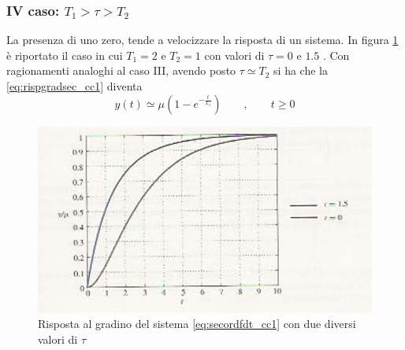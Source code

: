 \documentclass[a4paper]{report}
\begin{document}
\subsubsection{IV caso: $T_1 > \tau > T_2$}
La presenza di uno zero, tende a velocizzare la risposta di un
sistema. In figura \ref{fig:risp6} \`e riportato il caso in cui $T_1 =
2$ e $T_2 = 1$ con valori di $\tau = 0$ e $1.5$ . Con ragionamenti
analoghi al caso III, avendo posto $\tau \simeq T_2$ si ha che la
\ref{eq:rispgradsec_cc1} diventa
\begin{displaymath}
  y(t)\simeq \mu (1-e^{-\frac{t}{T_1}})\qquad , \qquad t\geq0
\end{displaymath}
\begin{figure}[!h]
  \begin{center}
    \includegraphics[scale=0.5]{./figures/rispscal6.png}
    \caption{Risposta al gradino del sistema \ref{eq:secordfdt_cc1} con
      due diversi valori di $\tau$}\label{fig:risp6}
  \end{center}
\end{figure}
\end{document}
